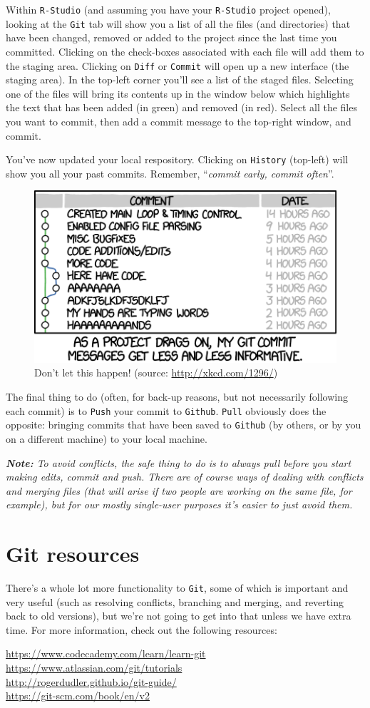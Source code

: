 \documentclass[12pt,letterpaper]{article}
\begin{document}
Within \texttt{R-Studio} (and assuming you have your \texttt{R-Studio} project opened), looking at the \texttt{Git} tab will show you a list of all the files (and directories) that have been changed, removed or added to the project since the last time you committed.  Clicking on the check-boxes associated with each file will add them to the staging area.  Clicking on \texttt{Diff} or \texttt{Commit} will open up a new interface (the staging area).  In the top-left corner you'll see a list of the staged files.  Selecting one of the files will bring its contents up in the window below which highlights the text that has been added (in green) and removed (in red).  Select all the files you want to commit, then add a commit message to the top-right window, and commit.

You've now updated your local respository.  Clicking on \texttt{History} (top-left) will show you all your past commits.  Remember, ``\emph{commit early, commit often}''.


\begin{figure}
	\centering
	\includegraphics[width=0.5\linewidth]{xkcd_git_commit.png}
	\caption{Don't let this happen!  (source: \url{http://xkcd.com/1296/})}
	\label{fig:commit_messages}
\end{figure}

The final thing to do (often, for back-up reasons, but not necessarily following each commit) is to \texttt{Push} your commit to \texttt{Github}.  \texttt{Pull} obviously does the opposite: bringing commits that have been saved to \texttt{Github} (by others, or by you on a different machine) to your local machine.

\emph{ \textbf{Note:}  To avoid conflicts, the safe thing to do is to always pull before you start making edits, commit and push.  There are of course ways of dealing with conflicts and merging files (that will arise if two people are working on the same file, for example), but for our mostly single-user purposes it's easier to just avoid them.}


\section{Git resources}
There's a whole lot more functionality to \texttt{Git}, some of which is important and very useful (such as resolving conflicts, branching and merging, and reverting back to old versions), but we're not going to get into that unless we have extra time.  For more information, check out the following resources:

\url{https://www.codecademy.com/learn/learn-git}\\
\url{https://www.atlassian.com/git/tutorials}\\
\url{http://rogerdudler.github.io/git-guide/}\\
\url{https://git-scm.com/book/en/v2}




\end{document}
